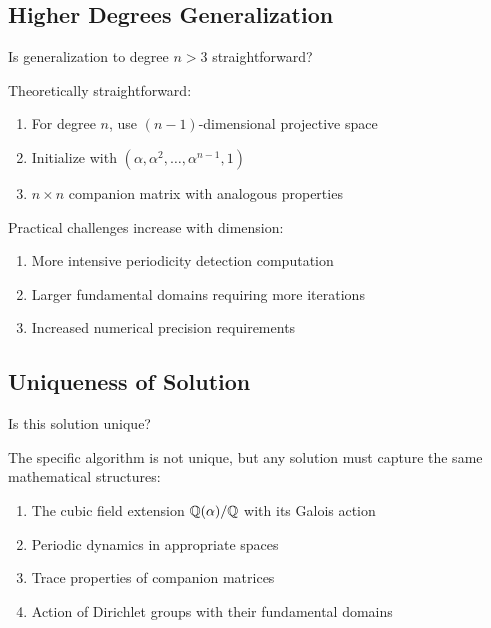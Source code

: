 \subsection{Higher Degrees Generalization}

\begin{objection}
Is generalization to degree $n > 3$ straightforward?
\end{objection}

\begin{response}
Theoretically straightforward:
\begin{enumerate}
\item For degree $n$, use $(n-1)$-dimensional projective space
\item Initialize with $(\alpha, \alpha^2, \ldots, \alpha^{n-1}, 1)$
\item $n \times n$ companion matrix with analogous properties
\end{enumerate}

Practical challenges increase with dimension:
\begin{enumerate}
\item More intensive periodicity detection computation
\item Larger fundamental domains requiring more iterations
\item Increased numerical precision requirements
\end{enumerate}
\end{response}

\subsection{Uniqueness of Solution}

\begin{objection}
Is this solution unique?
\end{objection}

\begin{response}
The specific algorithm is not unique, but any solution must capture the same mathematical structures:
\begin{enumerate}
\item The cubic field extension $\mathbb{Q}(\alpha)/\mathbb{Q}$ with its Galois action
\item Periodic dynamics in appropriate spaces
\item Trace properties of companion matrices
\item Action of Dirichlet groups with their fundamental domains
\end{enumerate}
\end{response}
